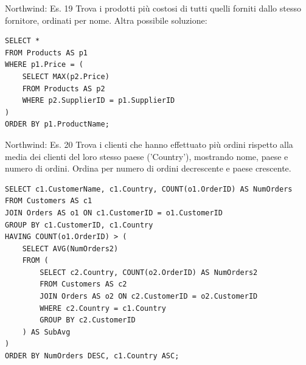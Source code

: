 \begin{frame}[fragile]{Northwind: Es. 19}
Trova i prodotti pi\`u costosi di tutti quelli forniti dallo stesso fornitore, ordinati per nome.
\newline
\newline
Altra possibile soluzione:
\begin{lstlisting}
SELECT *
FROM Products AS p1
WHERE p1.Price = (
    SELECT MAX(p2.Price)
    FROM Products AS p2
    WHERE p2.SupplierID = p1.SupplierID
)
ORDER BY p1.ProductName;
\end{lstlisting}
\end{frame}
%
\begin{frame}[fragile]{Northwind: Es. 20}
Trova i clienti che hanno effettuato pi\`u ordini rispetto alla media dei clienti del loro stesso 
paese ('Country'), mostrando nome, paese e numero di ordini. Ordina per numero di ordini decrescente e paese crescente.
\pause
\begin{lstlisting}[basicstyle=\scriptsize\ttfamily]
SELECT c1.CustomerName, c1.Country, COUNT(o1.OrderID) AS NumOrders
FROM Customers AS c1
JOIN Orders AS o1 ON c1.CustomerID = o1.CustomerID
GROUP BY c1.CustomerID, c1.Country
HAVING COUNT(o1.OrderID) > (
    SELECT AVG(NumOrders2)
    FROM (
        SELECT c2.Country, COUNT(o2.OrderID) AS NumOrders2
        FROM Customers AS c2
        JOIN Orders AS o2 ON c2.CustomerID = o2.CustomerID
        WHERE c2.Country = c1.Country
        GROUP BY c2.CustomerID
    ) AS SubAvg
)
ORDER BY NumOrders DESC, c1.Country ASC;
\end{lstlisting}
\end{frame}